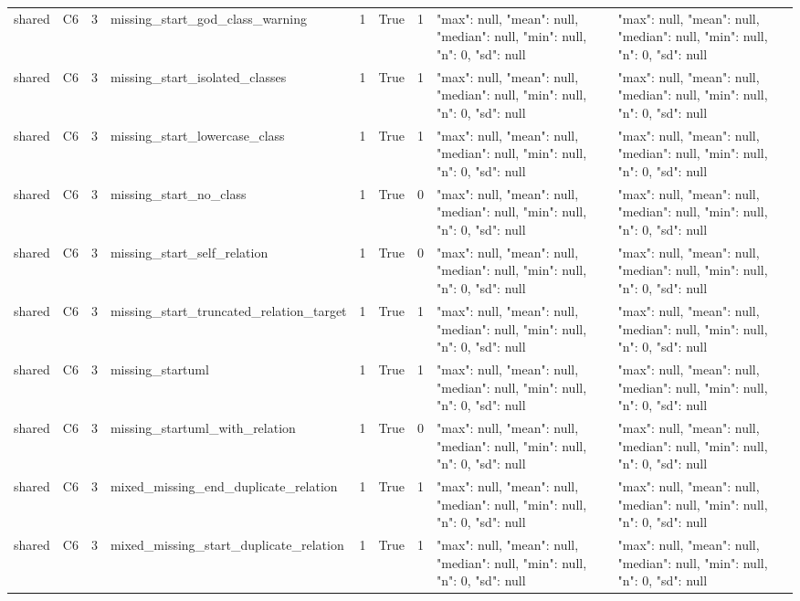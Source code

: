 \begin{tabular}{lllllllll}
shared & C6 & 3 & missing\_start\_god\_class\_warning & 1 & True & 1 & {"max": null, "mean": null, "median": null, "min": null, "n": 0, "sd": null} & {"max": null, "mean": null, "median": null, "min": null, "n": 0, "sd": null} \\
shared & C6 & 3 & missing\_start\_isolated\_classes & 1 & True & 1 & {"max": null, "mean": null, "median": null, "min": null, "n": 0, "sd": null} & {"max": null, "mean": null, "median": null, "min": null, "n": 0, "sd": null} \\
shared & C6 & 3 & missing\_start\_lowercase\_class & 1 & True & 1 & {"max": null, "mean": null, "median": null, "min": null, "n": 0, "sd": null} & {"max": null, "mean": null, "median": null, "min": null, "n": 0, "sd": null} \\
shared & C6 & 3 & missing\_start\_no\_class & 1 & True & 0 & {"max": null, "mean": null, "median": null, "min": null, "n": 0, "sd": null} & {"max": null, "mean": null, "median": null, "min": null, "n": 0, "sd": null} \\
shared & C6 & 3 & missing\_start\_self\_relation & 1 & True & 0 & {"max": null, "mean": null, "median": null, "min": null, "n": 0, "sd": null} & {"max": null, "mean": null, "median": null, "min": null, "n": 0, "sd": null} \\
shared & C6 & 3 & missing\_start\_truncated\_relation\_target & 1 & True & 1 & {"max": null, "mean": null, "median": null, "min": null, "n": 0, "sd": null} & {"max": null, "mean": null, "median": null, "min": null, "n": 0, "sd": null} \\
shared & C6 & 3 & missing\_startuml & 1 & True & 1 & {"max": null, "mean": null, "median": null, "min": null, "n": 0, "sd": null} & {"max": null, "mean": null, "median": null, "min": null, "n": 0, "sd": null} \\
shared & C6 & 3 & missing\_startuml\_with\_relation & 1 & True & 0 & {"max": null, "mean": null, "median": null, "min": null, "n": 0, "sd": null} & {"max": null, "mean": null, "median": null, "min": null, "n": 0, "sd": null} \\
shared & C6 & 3 & mixed\_missing\_end\_duplicate\_relation & 1 & True & 1 & {"max": null, "mean": null, "median": null, "min": null, "n": 0, "sd": null} & {"max": null, "mean": null, "median": null, "min": null, "n": 0, "sd": null} \\
shared & C6 & 3 & mixed\_missing\_start\_duplicate\_relation & 1 & True & 1 & {"max": null, "mean": null, "median": null, "min": null, "n": 0, "sd": null} & {"max": null, "mean": null, "median": null, "min": null, "n": 0, "sd": null} \\

\end{tabular}
